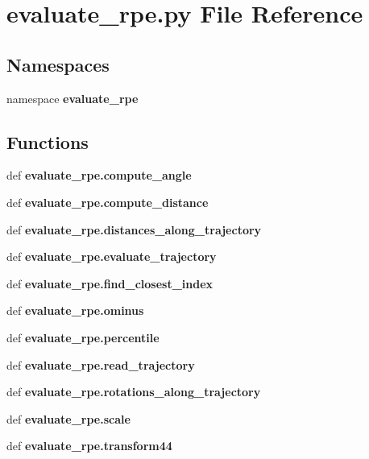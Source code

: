 \section{evaluate\-\_\-rpe.\-py \-File \-Reference}
\label{evaluate__rpe_8py}
\subsection*{\-Namespaces}
\begin{DoxyCompactItemize}
\item 
namespace {\bf evaluate\-\_\-rpe}
\end{DoxyCompactItemize}
\subsection*{\-Functions}
\begin{DoxyCompactItemize}
\item 
def {\bf evaluate\-\_\-rpe.\-compute\-\_\-angle}
\item 
def {\bf evaluate\-\_\-rpe.\-compute\-\_\-distance}
\item 
def {\bf evaluate\-\_\-rpe.\-distances\-\_\-along\-\_\-trajectory}
\item 
def {\bf evaluate\-\_\-rpe.\-evaluate\-\_\-trajectory}
\item 
def {\bf evaluate\-\_\-rpe.\-find\-\_\-closest\-\_\-index}
\item 
def {\bf evaluate\-\_\-rpe.\-ominus}
\item 
def {\bf evaluate\-\_\-rpe.\-percentile}
\item 
def {\bf evaluate\-\_\-rpe.\-read\-\_\-trajectory}
\item 
def {\bf evaluate\-\_\-rpe.\-rotations\-\_\-along\-\_\-trajectory}
\item 
def {\bf evaluate\-\_\-rpe.\-scale}
\item 
def {\bf evaluate\-\_\-rpe.\-transform44}
\end{DoxyCompactItemize}
